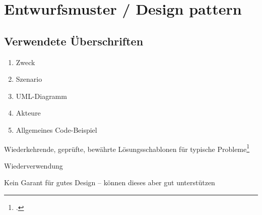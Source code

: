 \documentclass{lehramt-informatik-haupt}
\begin{document}

\chapter{Entwurfsmuster / Design pattern}

\begin{liQuellen}
\item \cite{wiki:entwurfsmuster}
\item \cite[Seite 39-43]{sosy:fs:3}
\end{liQuellen}

\section{Verwendete Überschriften}

\begin{enumerate}
\item Zweck
\item Szenario
\item UML-Diagramm
\item Akteure
\item Allgemeines Code-Beispiel
\end{enumerate}

Wiederkehrende, geprüfte, bewährte Lösungsschablonen für typische Probleme\footcite[Seite 39]{sosy:fs:3}

Wiederverwendung

Kein Garant für gutes Design – können dieses aber gut unterstützen
\end{document}
